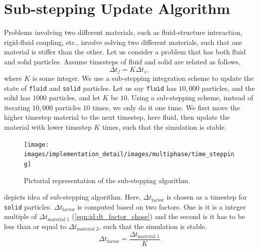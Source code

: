 \section{Sub-stepping Update Algorithm}
\label{sec:substepping-algorithm}
Problems involving two different materials, such as fluid-structure interaction,
rigid-fluid coupling, etc., involve solving two different materials, such that
one material is stiffer than the other. Let us consider a problem that has both
fluid and solid particles. Assume timesteps of fluid and solid are related as
follows,
\begin{equation}
\Delta t_f = K \Delta t_s,
\end{equation}
where $K$ is some integer. We use a sub-stepping integration scheme to update
the state of \texttt{fluid} and \texttt{solid} particles. Let us say
\texttt{fluid} has $10,000$ particles, and the solid has $1000$ particles, and
let $K$ be $10$. Using a sub-stepping scheme, instead of iterating $10,000$
particles $10$ times, we only do it one time. We first move the higher timestep
material to the next timestep, here fluid, then update the material with lower
timestep $K$ times, such that the simulation is stable.
\begin{figure}[!htpb]
  \centering
  \texttt{[image: images/implementation\_detail/images/multiphase/time\_stepping]}
  \caption{Pictorial representation of the sub-stepping algorithm.}
\label{fig:id:multiphase}
\end{figure}
 depicts idea of sub-stepping algorithm. Here,
$\Delta t_{\text{factor}}$ is chosen as a timestep for \texttt{solid} particles.
$\Delta t_{\text{factor}}$ is computed based on two factors. One is it is a
integer multiple of $\Delta t_{\text{material 1}}$
(\cref{eqn:id:dt_factor_chose}) and the second is it has to be less than or
equal to $\Delta t_{\text{material 2}}$, such that the simulation is stable.
\begin{equation}
\label{eqn:id:dt_factor_chose}
\Delta t_{\text{factor}} = \frac{\Delta t_{\text{material 1}}}{K}
\end{equation}


